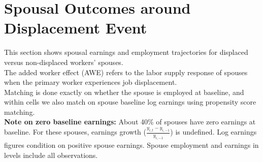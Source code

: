 \documentclass{article}
\begin{document}
\section{Spousal Outcomes around Displacement Event}
This section shows spousal earnings and employment trajectories for displaced versus non-displaced workers' spouses.
\\ The added worker effect (AWE) refers to the labor supply response of spouses
when the primary worker experiences job displacement.
\\ Matching is done exactly on whether the spouse is employed at baseline, and
within cells we also match on spouse baseline log earnings using propensity score matching.
\\
\textbf{Note on zero baseline earnings:} About 40\% of spouses have zero earnings at baseline.
For these spouses, earnings growth ($\frac{y_{i,t} - y_{i,-1}}{y_{i,-1}}$) is undefined.
Log earnings figures condition on positive spouse earnings.
Spouse employment and earnings in levels include all observations.
\end{document}
